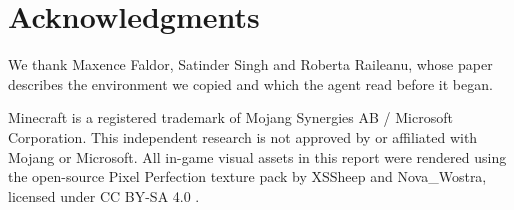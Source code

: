 \documentclass[11pt,a4paper]{article}
\begin{document}
\section*{Acknowledgments}

We thank Maxence Faldor, Satinder Singh and Roberta Raileanu, whose paper describes the environment we copied and which the agent read before it began.

Minecraft is a registered trademark of Mojang Synergies AB / Microsoft Corporation. This independent research is not approved by or affiliated with Mojang or Microsoft. All in-game visual assets in this report were rendered using the open-source Pixel Perfection texture pack by XSSheep and Nova\_Wostra, licensed under CC BY-SA 4.0 \citep{pixelperfection}.



\end{document}
